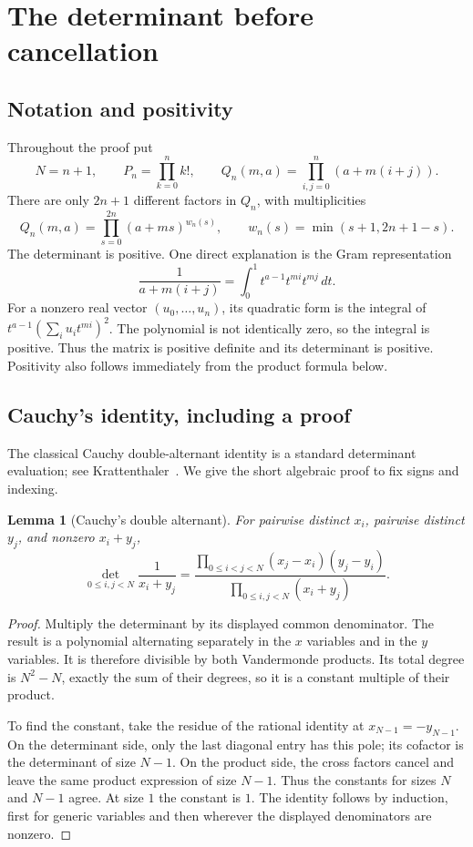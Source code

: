 \documentclass[11pt,a4paper]{article}
\numberwithin{equation}{section}
\newtheorem{lemma}[theorem]{Lemma}
\theoremstyle{definition}
\theoremstyle{remark}
\begin{document}
\section{The determinant before cancellation}\label{sec:cauchy}

\subsection{Notation and positivity}
Throughout the proof put
\[
 N=n+1,\qquad P_n=\prod_{k=0}^n k!,\qquad
 Q_n(m,a)=\prod_{i,j=0}^n(a+m(i+j)).
\]
There are only $2n+1$ different factors in $Q_n$, with multiplicities
\begin{equation}\label{eq:Qcompressed}
 Q_n(m,a)=\prod_{s=0}^{2n}(a+ms)^{w_n(s)},
 \qquad w_n(s)=\min(s+1,2n+1-s).
\end{equation}
The determinant is positive. One direct explanation is the Gram representation
\[
 \frac1{a+m(i+j)}=\int_0^1 t^{a-1}t^{mi}t^{mj}\,dt.
\]
For a nonzero real vector $(u_0,\ldots,u_n)$, its quadratic form is the integral of
$t^{a-1}(\sum_i u_it^{mi})^2$. The polynomial is not identically zero, so the integral is positive. Thus the matrix is positive definite and its determinant is positive. Positivity also follows immediately from the product formula below.

\subsection{Cauchy's identity, including a proof}
The classical Cauchy double-alternant identity is a standard determinant evaluation; see Krattenthaler~\cite[Eq.~(2.7)]{krattenthaler}. We give the short algebraic proof to fix signs and indexing.

\begin{lemma}[Cauchy's double alternant]\label{lem:cauchy}
For pairwise distinct $x_i$, pairwise distinct $y_j$, and nonzero $x_i+y_j$,
\begin{equation}\label{eq:cauchy}
 \det_{0\leq i,j<N}\frac1{x_i+y_j}
 =\frac{\displaystyle\prod_{0\leq i<j<N}(x_j-x_i)(y_j-y_i)}
 {\displaystyle\prod_{0\leq i,j<N}(x_i+y_j)}.
\end{equation}
\end{lemma}
\begin{proof}
Multiply the determinant by its displayed common denominator. The result is a polynomial alternating separately in the $x$ variables and in the $y$ variables. It is therefore divisible by both Vandermonde products. Its total degree is $N^2-N$, exactly the sum of their degrees, so it is a constant multiple of their product.

To find the constant, take the residue of the rational identity at $x_{N-1}=-y_{N-1}$. On the determinant side, only the last diagonal entry has this pole; its cofactor is the determinant of size $N-1$. On the product side, the cross factors cancel and leave the same product expression of size $N-1$. Thus the constants for sizes $N$ and $N-1$ agree. At size $1$ the constant is $1$. The identity follows by induction, first for generic variables and then wherever the displayed denominators are nonzero.
\end{proof}
\end{document}
